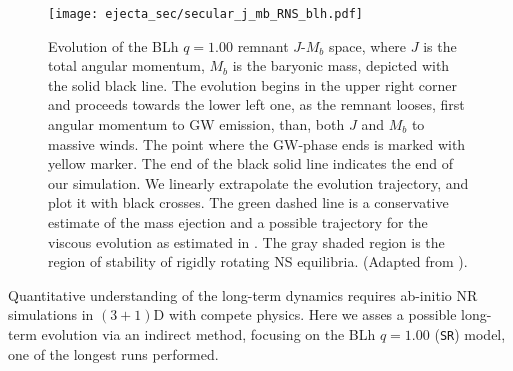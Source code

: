 \begin{figure}[t]
    \centering 
    \texttt{[image: ejecta\_sec/secular\_j\_mb\_RNS\_blh.pdf]}
    \caption{
        Evolution of the BLh $q=1.00$ \pmerg{} remnant $J$-$M_b$ space, where 
        $J$ is the total angular momentum, $M_b$ is the baryonic mass, 
        depicted with the solid black line. The evolution begins in the 
        upper right corner and proceeds towards the lower left one, as the 
        remnant looses, first angular momentum to \ac{GW} emission, than, 
        both $J$ and $M_b$ to massive winds. The point where the \ac{GW}-phase 
        ends is marked with yellow marker. 
        The end of the black solid line indicates the end of our simulation. 
        We linearly extrapolate the evolution trajectory, and plot it with black crosses. 
        The green dashed line is a conservative estimate
        of the mass ejection and a possible trajectory for the viscous
        evolution as estimated in \citet{Radice:2018xqa}. 
        The gray
        shaded region is the region of stability of rigidly rotating \ac{NS} 
        equilibria. 
        (Adapted from \citet{Nedora:2020pak}).
    }
    \label{fig:total_j_mb_rns_blh}
\end{figure}
Quantitative understanding of the long-term \pmerg{} dynamics 
requires ab-initio \ac{NR} simulations in $(3+1)$D with compete physics.
%
Here we asses a possible long-term evolution via an indirect method, 
focusing on the BLh $q=1.00$ (\texttt{SR}) model, one of the longest runs 
performed. 

